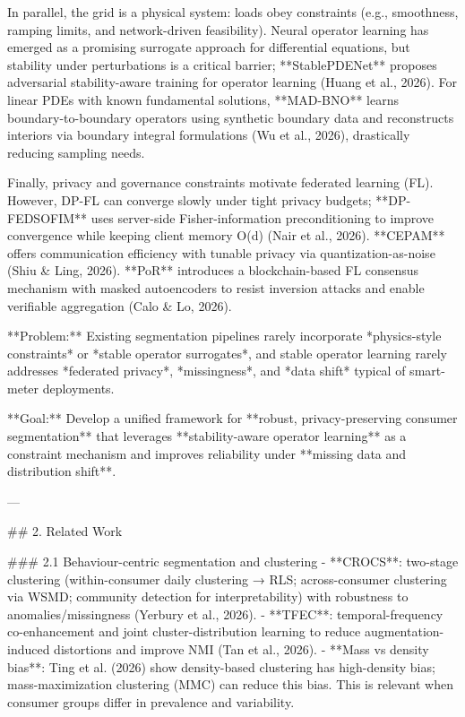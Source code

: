 In parallel, the grid is a physical system: loads obey constraints (e.g., smoothness, ramping limits, and network-driven feasibility). Neural operator learning has emerged as a promising surrogate approach for differential equations, but stability under perturbations is a critical barrier; **StablePDENet** proposes adversarial stability-aware training for operator learning (Huang et al., 2026). For linear PDEs with known fundamental solutions, **MAD-BNO** learns boundary-to-boundary operators using synthetic boundary data and reconstructs interiors via boundary integral formulations (Wu et al., 2026), drastically reducing sampling needs.  

Finally, privacy and governance constraints motivate federated learning (FL). However, DP-FL can converge slowly under tight privacy budgets; **DP-FEDSOFIM** uses server-side Fisher-information preconditioning to improve convergence while keeping client memory O(d) (Nair et al., 2026). **CEPAM** offers communication efficiency with tunable privacy via quantization-as-noise (Shiu & Ling, 2026). **PoR** introduces a blockchain-based FL consensus mechanism with masked autoencoders to resist inversion attacks and enable verifiable aggregation (Calo & Lo, 2026).  

**Problem:** Existing segmentation pipelines rarely incorporate *physics-style constraints* or *stable operator surrogates*, and stable operator learning rarely addresses *federated privacy*, *missingness*, and *data shift* typical of smart-meter deployments.  

**Goal:** Develop a unified framework for **robust, privacy-preserving consumer segmentation** that leverages **stability-aware operator learning** as a constraint mechanism and improves reliability under **missing data and distribution shift**.

---

## 2. Related Work  

### 2.1 Behaviour-centric segmentation and clustering  
- **CROCS**: two-stage clustering (within-consumer daily clustering → RLS; across-consumer clustering via WSMD; community detection for interpretability) with robustness to anomalies/missingness (Yerbury et al., 2026).  
- **TFEC**: temporal-frequency co-enhancement and joint cluster-distribution learning to reduce augmentation-induced distortions and improve NMI (Tan et al., 2026).  
- **Mass vs density bias**: Ting et al. (2026) show density-based clustering has high-density bias; mass-maximization clustering (MMC) can reduce this bias. This is relevant when consumer groups differ in prevalence and variability.

